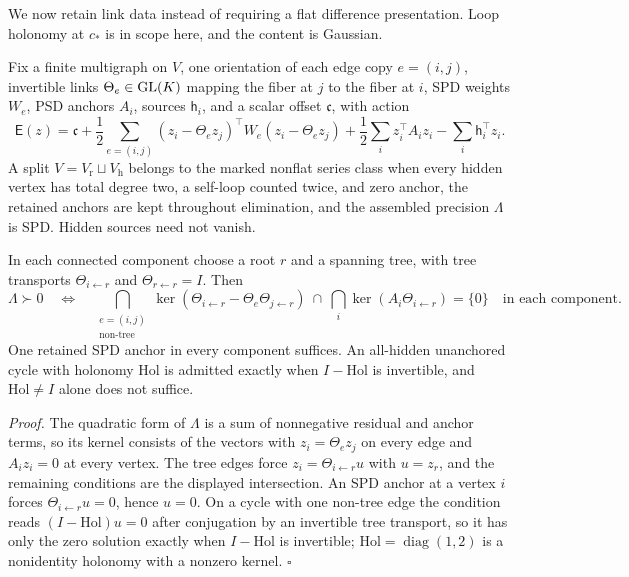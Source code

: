 We now retain link data instead of requiring a flat difference presentation.
Loop holonomy at \(c_*\) is in scope here, and the content is Gaussian.

Fix a finite multigraph on \(V\), one orientation of each edge copy
\(e=(i,j)\), invertible links \(\Theta_e\in\mathrm{GL}(K)\) mapping the fiber at \(j\) to
the fiber at \(i\), SPD weights \(W_e\), PSD anchors \(A_i\), sources
\(\mathsf h_i\), and a scalar offset \(\mathfrak c\), with action
\begin{equation}
\mathsf E(z)=\mathfrak c
+\frac12\sum_{e=(i,j)}
(z_i-\Theta_ez_j)^\top W_e(z_i-\Theta_ez_j)
+\frac12\sum_i z_i^\top A_i z_i-\sum_i \mathsf h_i^\top z_i .
\label{eq:cg-nonflat-series-action}
\end{equation}
A split \(V=V_{\mathrm r}\sqcup V_{\mathrm h}\) belongs to the marked nonflat
series class when every hidden vertex has total degree two, a self-loop counted
twice, and zero anchor, the retained anchors are kept throughout elimination,
and the assembled precision \(\Lambda\) is SPD. Hidden sources need not vanish.

In each connected component choose a root \(r\) and a spanning tree, with tree
transports \(\Theta_{i\leftarrow r}\) and \(\Theta_{r\leftarrow r}=I\). Then
\begin{equation}
\Lambda\succ0
\quad\Longleftrightarrow\quad
\bigcap_{\substack{e=(i,j)\\\text{non-tree}}}
\ker(\Theta_{i\leftarrow r}-\Theta_e\Theta_{j\leftarrow r})
\ \cap\ \bigcap_i\ker(A_i\Theta_{i\leftarrow r})=\{0\}
\quad\text{in each component}.
\label{eq:cg-nonflat-series-properness}
\end{equation}
One retained SPD anchor in every component suffices. An all-hidden unanchored
cycle with holonomy \(\mathrm{Hol}\) is admitted exactly when \(I-\mathrm{Hol}\)
is invertible, and \(\mathrm{Hol}\neq I\) alone does not suffice.

\noindent\emph{Proof.}
The quadratic form of \(\Lambda\) is a sum of nonnegative residual and anchor
terms, so its kernel consists of the vectors with \(z_i=\Theta_ez_j\) on every
edge and \(A_iz_i=0\) at every vertex. The tree edges force
\(z_i=\Theta_{i\leftarrow r}u\) with \(u=z_r\), and the remaining conditions are
the displayed intersection. An SPD anchor at a vertex \(i\) forces
\(\Theta_{i\leftarrow r}u=0\), hence \(u=0\). On a cycle with one non-tree edge
the condition reads \((I-\mathrm{Hol})u=0\) after conjugation by an invertible
tree transport, so it has only the zero solution exactly when \(I-\mathrm{Hol}\)
is invertible; \(\mathrm{Hol}=\operatorname{diag}(1,2)\) is a nonidentity
holonomy with a nonzero kernel. \(\square\)

